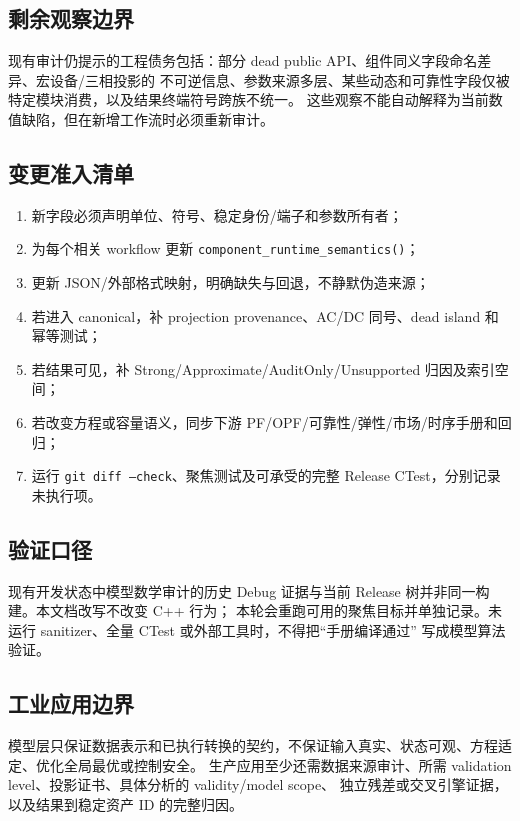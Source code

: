 \subsection{剩余观察边界}

现有审计仍提示的工程债务包括：部分 dead public API、组件同义字段命名差异、宏设备/三相投影的
不可逆信息、参数来源多层、某些动态和可靠性字段仅被特定模块消费，以及结果终端符号跨族不统一。
这些观察不能自动解释为当前数值缺陷，但在新增工作流时必须重新审计。

\subsection{变更准入清单}

\begin{enumerate}
  \item 新字段必须声明单位、符号、稳定身份/端子和参数所有者；
  \item 为每个相关 workflow 更新 \texttt{component\_runtime\_semantics()}；
  \item 更新 JSON/外部格式映射，明确缺失与回退，不静默伪造来源；
  \item 若进入 canonical，补 projection provenance、AC/DC 同号、dead island 和幂等测试；
  \item 若结果可见，补 Strong/Approximate/AuditOnly/Unsupported 归因及索引空间；
  \item 若改变方程或容量语义，同步下游 PF/OPF/可靠性/弹性/市场/时序手册和回归；
  \item 运行 \texttt{git diff --check}、聚焦测试及可承受的完整 Release CTest，分别记录未执行项。
\end{enumerate}

\subsection{验证口径}

现有开发状态中模型数学审计的历史 Debug 证据与当前 Release 树并非同一构建。本文档改写不改变 C++ 行为；
本轮会重跑可用的聚焦目标并单独记录。未运行 sanitizer、全量 CTest 或外部工具时，不得把“手册编译通过”
写成模型算法验证。

\subsection{工业应用边界}

模型层只保证数据表示和已执行转换的契约，不保证输入真实、状态可观、方程适定、优化全局最优或控制安全。
生产应用至少还需数据来源审计、所需 validation level、投影证书、具体分析的 validity/model scope、
独立残差或交叉引擎证据，以及结果到稳定资产 ID 的完整归因。
